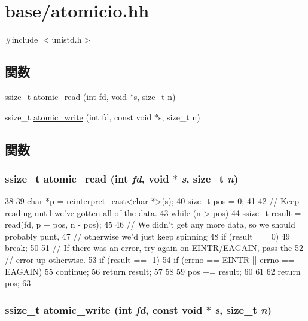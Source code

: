\hypertarget{atomicio_8hh}{
\section{base/atomicio.hh}
\label{atomicio_8hh}
}
{\ttfamily \#include $<$unistd.h$>$}\par
\subsection*{関数}
\begin{DoxyCompactItemize}
\item 
ssize\_\-t \hyperlink{atomicio_8hh_a09f17b802426457c2389d892357e50f7}{atomic\_\-read} (int fd, void $\ast$s, size\_\-t n)
\item 
ssize\_\-t \hyperlink{atomicio_8hh_a301f476c6c8d75d54f43aea6ad1ff740}{atomic\_\-write} (int fd, const void $\ast$s, size\_\-t n)
\end{DoxyCompactItemize}


\subsection{関数}
\hypertarget{atomicio_8hh_a09f17b802426457c2389d892357e50f7}{
\subsubsection[{atomic\_\-read}]{\setlength{\rightskip}{0pt plus 5cm}ssize\_\-t atomic\_\-read (int {\em fd}, \/  void $\ast$ {\em s}, \/  size\_\-t {\em n})}}
\label{atomicio_8hh_a09f17b802426457c2389d892357e50f7}



\begin{DoxyCode}
38 {
39     char *p = reinterpret_cast<char *>(s);
40     size_t pos = 0;
41 
42     // Keep reading until we've gotten all of the data.
43     while (n > pos) {
44         ssize_t result = read(fd, p + pos, n - pos);
45 
46         // We didn't get any more data, so we should probably punt,
47         // otherwise we'd just keep spinning
48         if (result == 0)
49             break;
50 
51         // If there was an error, try again on EINTR/EAGAIN, pass the
52         // error up otherwise.
53         if (result == -1) {
54             if (errno == EINTR || errno == EAGAIN)
55                 continue;
56             return result;
57         }
58 
59         pos += result;
60     }
61 
62     return pos;
63 }
\end{DoxyCode}
\hypertarget{atomicio_8hh_a301f476c6c8d75d54f43aea6ad1ff740}{
\subsubsection[{atomic\_\-write}]{\setlength{\rightskip}{0pt plus 5cm}ssize\_\-t atomic\_\-write (int {\em fd}, \/  const void $\ast$ {\em s}, \/  size\_\-t {\em n})}}
\label{atomicio_8hh_a301f476c6c8d75d54f43aea6ad1ff740}



